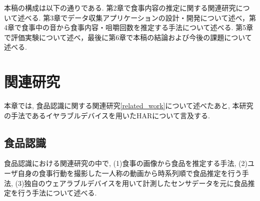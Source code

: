 本稿の構成は以下の通りである.
第2章で食事内容の推定に関する関連研究について述べる. 第3章でデータ収集アプリケーションの設計・開発について述べ，第4章で食事中の音から食事内容・咀嚼回数を推定する手法について述べる. 第5章で評価実験について述べ，最後に第6章で本稿の結論および今後の課題について述べる.

\chapter{関連研究}

本章では, 食品認識に関する関連研究\ref{related_work}について述べたあと, 本研究の手法であるイヤラブルデバイスを用いたHARについて言及する.

\begin{table}[t]
    \centering
    \caption{食品認識に関する関連研究}
    \label{related_work}
\end{table}

\section{食品認識}

食品認識における関連研究の中で, (1)食事の画像から食品を推定する手法, (2)ユーザ自身の食事行動を撮影した一人称の動画から時系列順で食品推定を行う手法, (3)独自のウェアラブルデバイスを用いて計測したセンサデータを元に食品推定を行う手法について述べる.


